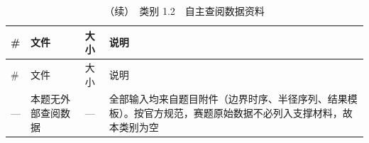 \begin{longtable}{>{\centering\arraybackslash}m{\dimexpr 0.072\tblw\relax}>{\raggedright\arraybackslash}m{\dimexpr 0.222\tblw\relax}>{\centering\arraybackslash}m{\dimexpr 0.090\tblw\relax}>{\raggedright\arraybackslash}m{\dimexpr 0.616\tblw\relax}}
  \caption{（续）　类别 1.2　自主查阅数据资料}\label{tab:A-1-c}\\
  \toprule
    \# & 文件 & 大小 & 说明 \\
  \midrule
  \endfirsthead
  \toprule
    \# & 文件 & 大小 & 说明 \\
  \midrule
  \endhead
  \bottomrule
  \endfoot
  \bottomrule
  \endlastfoot
  — & 本题无外部查阅数据 & — & 全部输入均来自题目附件（边界时序、半径序列、结果模板）。按官方规范，赛题原始数据不必列入支撑材料，故本类别为空 \\
\end{longtable}



